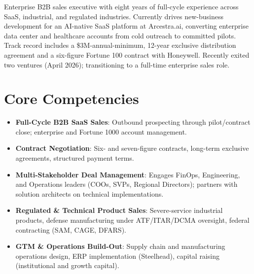 \documentclass[11pt,a4paper,sans]{moderncv}
\begin{document}
\makecvtitle


\vspace{6pt}
\small{Enterprise B2B sales executive with eight years of full-cycle experience across SaaS, industrial, and regulated industries. Currently drives new-business development for an AI-native SaaS platform at Arcestra.ai, converting enterprise data center and healthcare accounts from cold outreach to committed pilots. Track record includes a \$3M-annual-minimum, 12-year exclusive distribution agreement and a six-figure Fortune 100 contract with Honeywell. Recently exited two ventures (April 2026); transitioning to a full-time enterprise sales role.}


\section{Core Competencies}
\vspace{1pt}
\begin{itemize}

\item \textbf{Full-Cycle B2B SaaS Sales}: Outbound prospecting through pilot/contract close; enterprise and Fortune 1000 account management.

\item \textbf{Contract Negotiation}: Six- and seven-figure contracts, long-term exclusive agreements, structured payment terms.

\item \textbf{Multi-Stakeholder Deal Management}: Engages FinOps, Engineering, and Operations leaders (COOs, SVPs, Regional Directors); partners with solution architects on technical implementations.

\item \textbf{Regulated & Technical Product Sales}: Severe-service industrial products, defense manufacturing under ATF/ITAR/DCMA oversight, federal contracting (SAM, CAGE, DFARS).

\item \textbf{GTM \& Operations Build-Out}: Supply chain and manufacturing operations design, ERP implementation (Steelhead), capital raising (institutional and growth capital).

\end{itemize}
\end{document}
